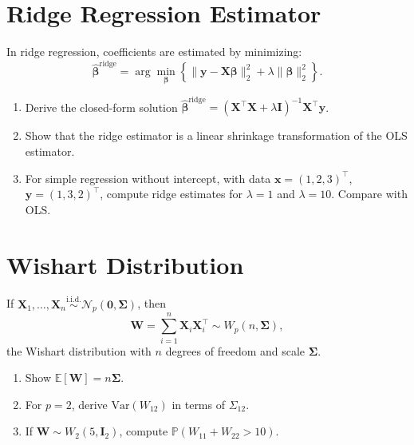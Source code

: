 \documentclass[12pt,a4paper]{article}
\begin{document}
\section{Ridge Regression Estimator}
In ridge regression, coefficients are estimated by minimizing:
\[
\hat{\boldsymbol{\beta}}^{\mathrm{ridge}} =
\arg\min_{\boldsymbol{\beta}}
\left\{ \|\mathbf{y} - \mathbf{X}\boldsymbol{\beta}\|_2^2 +
\lambda \|\boldsymbol{\beta}\|_2^2 \right\}.
\]
\begin{enumerate}[label=(\arabic*)]
\item Derive the closed-form solution \( \hat{\boldsymbol{\beta}}^{\mathrm{ridge}} = (\mathbf{X}^\top \mathbf{X} + \lambda \mathbf{I})^{-1}\mathbf{X}^\top \mathbf{y} \).
\item Show that the ridge estimator is a linear shrinkage transformation of the OLS estimator.
\item For simple regression without intercept, with data \( \mathbf{x}=(1,2,3)^\top \), \( \mathbf{y}=(1,3,2)^\top \), compute ridge estimates for \( \lambda=1 \) and \( \lambda=10 \).
Compare with OLS.
\end{enumerate}

\section{Wishart Distribution}
If \( \mathbf{X}_1, \ldots, \mathbf{X}_n \stackrel{\text{i.i.d.}}{\sim} \mathcal{N}_p(\mathbf{0},\boldsymbol{\Sigma}) \), then
\[
\mathbf{W} = \sum_{i=1}^n \mathbf{X}_i \mathbf{X}_i^\top \sim W_p(n,\boldsymbol{\Sigma}),
\]
the Wishart distribution with \( n \) degrees of freedom and scale \( \boldsymbol{\Sigma} \).
\begin{enumerate}[label=(\arabic*)]
\item Show \( \mathbb{E}[\mathbf{W}] = n\boldsymbol{\Sigma} \).
\item For \( p=2 \), derive \( \mathrm{Var}(W_{12}) \) in terms of \( \Sigma_{12} \).
\item If \( \mathbf{W}\sim W_2(5,\mathbf{I}_2) \), compute \( \mathbb{P}(W_{11}+W_{22}>10) \).
\end{enumerate}
\end{document}
